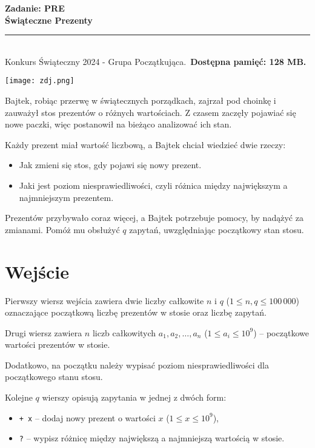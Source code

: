 \documentclass[a4paper,11pt]{article}
\newcommand{\tasktitle}{Świąteczne Prezenty}
\newcommand{\taskshort}{PRE}
\newcommand{\contestinfo}{Konkurs Świąteczny 2024 - Grupa Początkująca.}
\newcommand{\memorylimit}{128 MB}
\begin{document}
\noindent\textbf{\LARGE Zadanie: \taskshort} \\
\textbf{\Large \tasktitle} \\
\rule{\textwidth}{0.4pt} \\
\small \contestinfo \
\textbf{Dostępna pamięć: \memorylimit.}

\begin{center}
\texttt{[image: zdj.png]} %
\end{center}

\noindent Bajtek, robiąc przerwę w świątecznych porządkach, zajrzał pod choinkę i zauważył stos prezentów o różnych wartościach. Z czasem zaczęły pojawiać się nowe paczki, więc postanowił na bieżąco analizować ich stan.

Każdy prezent miał wartość liczbową, a Bajtek chciał wiedzieć dwie rzeczy:
\begin{itemize}
    \item Jak zmieni się stos, gdy pojawi się nowy prezent.
    \item Jaki jest poziom niesprawiedliwości, czyli różnica między największym a najmniejszym prezentem.
\end{itemize}
Prezentów przybywało coraz więcej, a Bajtek potrzebuje pomocy, by nadążyć za zmianami. Pomóż mu obsłużyć $q$ zapytań, uwzględniając początkowy stan stosu.

\section*{Wejście}
Pierwszy wiersz wejścia zawiera dwie liczby całkowite $n$ i $q$ ($1 \leq n, q \leq 100\,000$) oznaczające początkową liczbę prezentów w stosie oraz liczbę zapytań.

Drugi wiersz zawiera $n$ liczb całkowitych $a_1, a_2, \dots, a_n$ ($1 \leq a_i \leq 10^9$) – początkowe wartości prezentów w stosie.

Dodatkowo, na początku należy wypisać poziom niesprawiedliwości dla początkowego stanu stosu.

Kolejne $q$ wierszy opisują zapytania w jednej z dwóch form:
\begin{itemize}
    \item \texttt{+ x} – dodaj nowy prezent o wartości $x$ ($1 \leq x \leq 10^9$),
    \item \texttt{?} – wypisz różnicę między największą a najmniejszą wartością w stosie.
\end{itemize}
\end{document}
